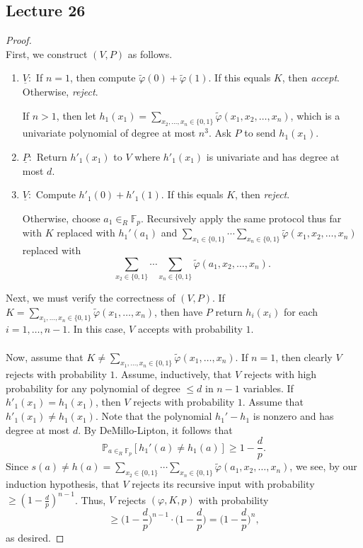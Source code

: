 \documentclass[10pt,letterpaper,cm]{nupset}
\theoremstyle{definition}
\newcommand{\F}{\mathbb F}
\newcommand{\1}{\mathbf{1}}
\newcommand{\0}{\vec 0}
\begin{document}
\subsection{Lecture 26}

\begin{proof} $ $
\\First, we construct $(V, P)$ as follows. 
\begin{enumerate}
\item $\underline{V}:$ If $n=1$, then compute $\tilde{\varphi}(0) + \tilde{\varphi}(1)$. If this equals $K$, then \textit{accept}. Otherwise, \textit{reject}. 

If $n>1$, then let $h_1(x_1) = \sum_{x_2, \ldots, x_n \in \{0,1\}} \tilde{\varphi}(x_1, x_2, \ldots, x_n)$, which is a univariate polynomial of degree at most $n^3$. Ask $P$ to send $h_1(x_1)$. 
\item $\underline{P}:$ Return  $h'_1(x_1)$ to $V$ where $h'_1(x_1)$ is univariate and has degree at most $d$. 
\item $\underline{V}:$ Compute $h'_1(0) + h'_1(1)$. If this equals $K$, then \textit{reject}. 

Otherwise,  choose $a_1 \in_R \F_p$. Recursively apply the same protocol thus far with $K$ replaced with $h_1'(a_1)$ and $ \sum_{x_1 \in \{0,1\}} \cdots \sum_{x_n \in \{0,1\}} \tilde{\varphi}(x_1, x_2, \ldots, x_n)$ replaced with $$\sum_{x_2 \in \{0,1\}} \cdots \sum_{x_n \in \{0,1\}} \tilde{\varphi}(a_1, x_2, \ldots, x_n).$$
\end{enumerate}
Next, we must verify the correctness of $(V,P)$. If $K = \sum_{x_1, \ldots, x_n \in \{0,1\}} \tilde{\varphi}(x_1, \ldots, x_n)$, then have $P$ return $h_i(x_i)$ for each $i=1, \ldots, {n-1}$. In this case, $V$ accepts with probability $1$. 
\\ \\ Now, assume that $K \ne \sum_{x_1, \ldots, x_n \in \{0,1\}} \tilde{\varphi}(x_1, \ldots, x_n)$.  If $n=1$, then clearly $V$ rejects with probability $1$. Assume, inductively, that $V$ rejects with high probability for any polynomial of degree $\leq d$ in $n-1$ variables. If $h'_1(x_1) = h_1(x_1)$, then $V$ rejects with probability $1$. Assume that $h'_1(x_1) \ne h_1(x_1)$.  Note that the polynomial $h_1' - h_1$ is nonzero and has degree at most $d$.  By DeMillo-Lipton, it follows that  $$\mathbb{P}_{a \in_R \F_p} [h_1'(a) \ne h_1(a)] \geq 1- \frac{d}{p}.$$ Since $s(a) \ne h(a) = \sum_{x_2 \in \{0,1\}} \cdots \sum_{x_n \in \{0,1\}} \tilde{\varphi}(a_1, x_2, \ldots, x_n)$, we see, by our induction hypothesis, that $V$ rejects its recursive input with probability $\geq (1-\frac{d}{p})^{n-1}$. Thus, $V$ rejects $(\varphi, K, p)$ with probability $$ \geq \big (1-\frac{d}{p}\big )^{n-1} \cdot \big (1-\frac{d}{p}\big ) = \big (1-\frac{d}{p}\big )^{n},$$ as desired.
\end{proof}
\end{document}

